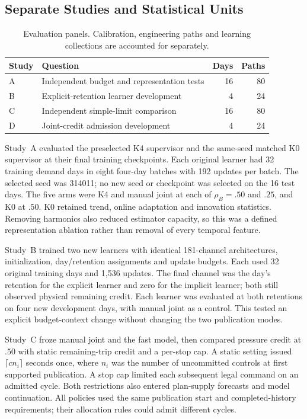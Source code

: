 \subsection{Separate Studies and Statistical Units}
\begin{table}[t]
\centering\footnotesize
\caption{Evaluation panels. Calibration, engineering paths and learning collections are accounted for separately.}
\label{tab:panels}
\begin{tabularx}{\columnwidth}{@{}lYrr@{}}
\toprule
Study & Question & Days & Paths\\
\midrule
A & Independent budget and representation tests & 16 & 80\\
B & Explicit-retention learner development & 4 & 24\\
C & Independent simple-limit comparison & 16 & 80\\
D & Joint-credit admission development & 4 & 24\\
\bottomrule
\end{tabularx}
\end{table}

Study~A evaluated the preselected K4 supervisor and the same-seed matched K0 supervisor at their final training checkpoints. Each original learner had 32 training demand days in eight four-day batches with 192 updates per batch. The selected seed was 314011; no new seed or checkpoint was selected on the 16 test days. The five arms were K4 and manual joint at each of $\rho_B=.50$ and $.25$, and K0 at $.50$. K0 retained trend, online adaptation and innovation statistics. Removing harmonics also reduced estimator capacity, so this was a defined representation ablation rather than removal of every temporal feature.

Study~B trained two new learners with identical 181-channel architectures, initialization, day/retention assignments and update budgets. Each used 32 original training days and 1,536 updates. The final channel was the day's retention for the explicit learner and zero for the implicit learner; both still observed physical remaining credit. Each learner was evaluated at both retentions on four new development days, with manual joint as a control. This tested an explicit budget-context change without changing the two publication modes.

Study~C froze manual joint and the fast model, then compared pressure credit at $.50$ with static remaining-trip credit and a per-stop cap. A static setting issued $\lceil c n_i\rceil$ seconds once, where $n_i$ was the number of uncommitted controls at first supported publication. A stop cap limited each subsequent legal command on an admitted cycle. Both restrictions also entered plan-supply forecasts and model continuation. All policies used the same publication start and completed-history requirements; their allocation rules could admit different cycles.

